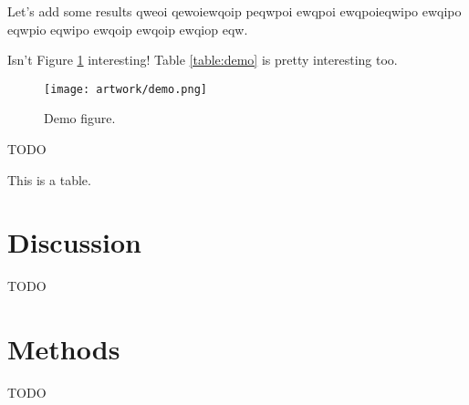 \documentclass[a4paper,11pt,abstracton]{scrartcl}
\begin{document}
Let's add some results qweoi qewoiewqoip peqwpoi ewqpoi ewqpoieqwipo ewqipo eqwpio eqwipo ewqoip ewqoip ewqiop eqw.

Isn't Figure \ref{fig:demo} interesting! 
%
Table \ref{table:demo} is pretty interesting too.

\begin{landscape}
\begin{table}[h]
  \small
  \centering
  
  \caption{
\textbf{Non-synonymous mutations in the voltage-gated sodium channel gene}. 
%
All mutations are at 5\% frequency or above in one or more of the 9 Ag1000G phase 1 populations, with the exception of \texttt{2,400,071 G>T} which is only found in the CM\emph{Ag} population at 0.4\% frequency but is included because another mutation (\texttt{2,400,071 G>A}) is found at the same position causing the same amino acid substitution (\texttt{M490I}). 
%
Substitutions marked with an asterisk (*) failed conservative variant filters applied genome-wide in the Ag1000G phase 1 AR3 callset, but appeared sound on manual inspection of read alignments.
}
  \label{table:variants_missense}
\end{table}
\end{landscape}

\begin{figure}[t!]
  \texttt{[image: artwork/demo.png]}
  \caption{Demo figure.}
  \label{fig:demo}
\end{figure}

TODO

\begin{table}[h]
  \centering
  
  \caption{This is a table.}
  \label{table:demo}
\end{table}

\section*{Discussion}

TODO

\section*{Methods}

TODO

\printbibliography
\end{document}
